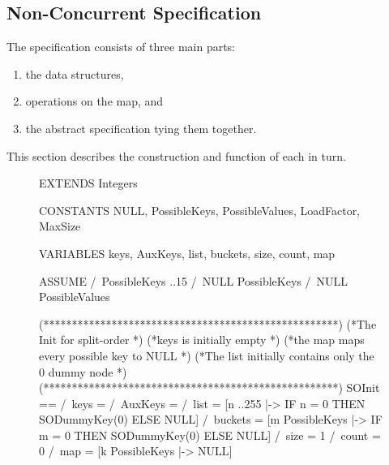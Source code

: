 \documentclass{uit-thesis}
\begin{document}
\subsection{Non-Concurrent Specification}\label{subsec:non-concurrent}
The specification consists of three main parts:
\begin{enumerate}[label=\textbf{\arabic*.}]
    \item \label{SpecList:structures} the data structures,
    \item \label{SpecList:operations} operations on the map, and
    \item \label{SpecList:spec} the abstract specification tying them together.
\end{enumerate}
This section describes the construction and function of each in turn.
\begin{figure}
    \begin{tla}
EXTENDS Integers

CONSTANTS NULL, PossibleKeys, PossibleValues, LoadFactor, MaxSize

VARIABLES keys, AuxKeys, list, buckets, size, count, map

ASSUME
    /\ PossibleKeys ..15
    /\ NULL \notin PossibleKeys
    /\ NULL \notin PossibleValues

(****************************************************)
(*The Init for split-order                          *)
(*keys is initially empty                           *)
(*the map maps every possible key to NULL           *)
(*The list initially contains only the 0 dummy node *)
(****************************************************)
SOInit ==   /\ keys = {}
            /\ AuxKeys = {}
            /\ list = [n ..255 |-> IF n = 0 THEN SODummyKey(0) ELSE NULL]
            /\ buckets = [m \in PossibleKeys |-> IF m = 0 THEN SODummyKey(0) ELSE NULL]
            /\ size = 1
            /\ count = 0
            /\ map = [k \in PossibleKeys |-> NULL]


\end{tla}
\end{figure}
\end{document}

